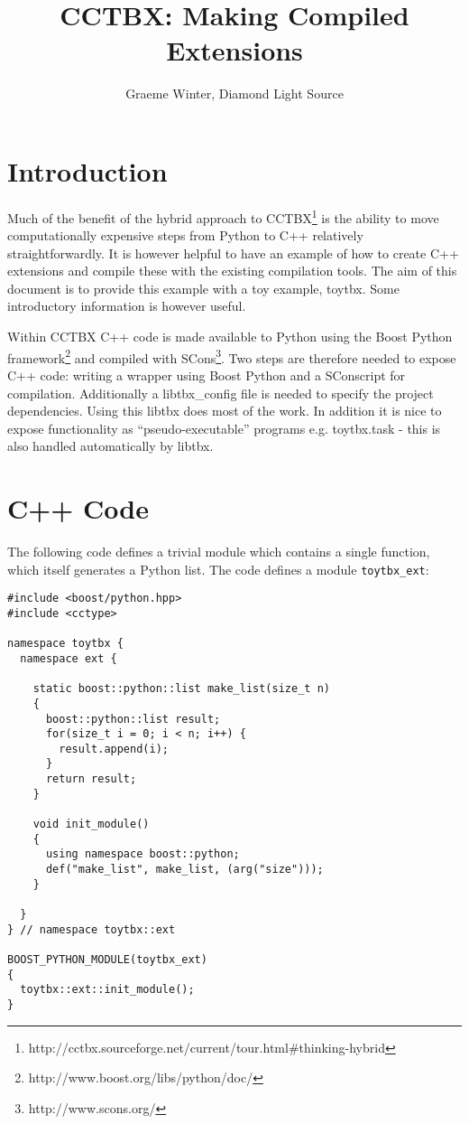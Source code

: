 \documentclass[a4paper, 11pt]{article}
\title{CCTBX: Making Compiled Extensions}
\author{Graeme Winter, Diamond Light Source}
\begin{document}
\maketitle

\section{Introduction}

Much of the benefit of the hybrid approach to CCTBX\footnote{http://cctbx.sourceforge.net/current/tour.html\#thinking-hybrid} is the ability to move computationally expensive steps from Python to C++ relatively straightforwardly. It is however helpful to have an example of how to create C++ extensions and compile these with the existing compilation tools. The aim of this document is to provide this example with a toy example, toytbx. Some introductory information is however useful.

Within CCTBX C++ code is made available to Python using the Boost Python framework\footnote{http://www.boost.org/libs/python/doc/} and compiled with SCons\footnote{http://www.scons.org/}. Two steps are therefore needed to expose C++ code: writing a wrapper using Boost Python and a SConscript for compilation. Additionally a libtbx\_config file is needed to specify the project dependencies. Using this libtbx does most of the work. In addition it is nice to expose functionality as ``pseudo-executable'' programs e.g. toytbx.task - this is also handled automatically by libtbx.

\section{C++ Code}

The following code defines a trivial module which contains a single function, which itself generates a Python list. The code defines a module \verb|toytbx_ext|:

{\small
\begin{verbatim}
#include <boost/python.hpp>
#include <cctype>

namespace toytbx { 
  namespace ext {

    static boost::python::list make_list(size_t n)
    {
      boost::python::list result;
      for(size_t i = 0; i < n; i++) {
        result.append(i);
      }
      return result;
    }

    void init_module()
    {
      using namespace boost::python;
      def("make_list", make_list, (arg("size")));
    }

  }
} // namespace toytbx::ext

BOOST_PYTHON_MODULE(toytbx_ext)
{
  toytbx::ext::init_module();
}
\end{verbatim}
}
\end{document}
